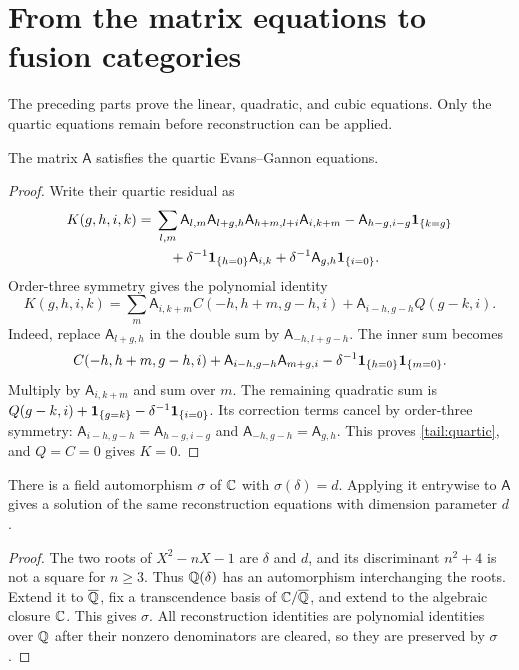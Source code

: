 \section{From the matrix equations to fusion categories}
\label{tail:reconstruction}

The preceding parts prove the linear, quadratic, and cubic equations.
Only the quartic equations remain before reconstruction can be applied.

\begin{lemma}\label{tail:quartic-lemma}
The matrix $\mathsf A$ satisfies the quartic Evans--Gannon equations.
\end{lemma}

\begin{proof}
Write their quartic residual as
\begin{align*}
 K(g,h,i,k)={}&\sum_{l,m}\mathsf A_{l,m}\mathsf A_{l+g,h}
                  \mathsf A_{h+m,l+i}\mathsf A_{i,k+m}
       -\mathsf A_{h-g,i-g}\mathbf1_{\{k=g\}}\\
 &\quad+\delta^{-1}\mathbf1_{\{h=0\}}\mathsf A_{i,k}
       +\delta^{-1}\mathsf A_{g,h}\mathbf1_{\{i=0\}}.
\end{align*}
Order-three symmetry gives the polynomial identity
\begin{equation}\label{tail:quartic}
 K(g,h,i,k)=\sum_m\mathsf A_{i,k+m}C(-h,h+m,g-h,i)
             +\mathsf A_{i-h,g-h}Q(g-k,i).
\end{equation}
Indeed, replace $\mathsf A_{l+g,h}$ in the double sum by
$\mathsf A_{-h,l+g-h}$. The inner sum becomes
\[
 C(-h,h+m,g-h,i)+\mathsf A_{i-h,g-h}\mathsf A_{m+g,i}
                  -\delta^{-1}\mathbf1_{\{h=0\}}\mathbf1_{\{m=0\}}.
\]
Multiply by $\mathsf A_{i,k+m}$ and sum over $m$.
The remaining quadratic sum is
$Q(g-k,i)+\mathbf1_{\{g=k\}}-\delta^{-1}\mathbf1_{\{i=0\}}$.
Its correction terms cancel by order-three symmetry:
$\mathsf A_{i-h,g-h}=\mathsf A_{h-g,i-g}$ and
$\mathsf A_{-h,g-h}=\mathsf A_{g,h}$.
This proves \eqref{tail:quartic}, and $Q=C=0$ gives $K=0$.
\end{proof}

\begin{lemma}\label{tail:embedding}
There is a field automorphism $\sigma$ of $\mathbb C$ with $\sigma(\delta)=d$.
Applying it entrywise to $\mathsf A$ gives a solution of the same
reconstruction equations with dimension parameter $d$.
\end{lemma}

\begin{proof}
The two roots of $X^2-nX-1$ are $\delta$ and $d$, and its
discriminant $n^2+4$ is not a square for $n\ge3$.
Thus $\mathbb Q(\delta)$ has an automorphism interchanging the roots.
Extend it to $\overline{\mathbb Q}$, fix a transcendence basis of
$\mathbb C/\overline{\mathbb Q}$, and extend to the algebraic closure $\mathbb C$.
This gives $\sigma$. All reconstruction identities are polynomial
identities over $\mathbb Q$ after their nonzero denominators are cleared,
so they are preserved by $\sigma$.
\end{proof}


